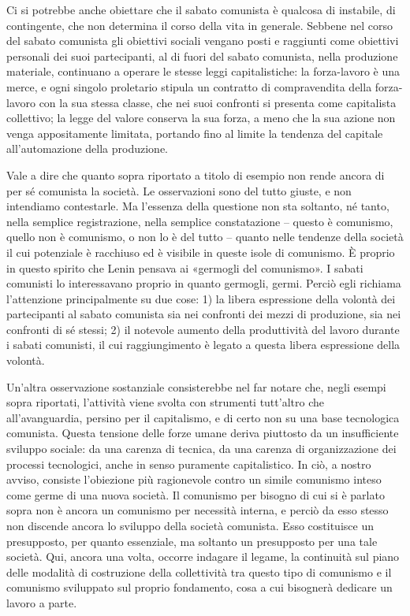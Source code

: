\documentclass[12pt,a4paper,openany]{book}
\begin{document}
Ci si potrebbe anche obiettare che il sabato comunista è qualcosa di instabile, di contingente, che non determina il corso della vita in generale. Sebbene nel corso del sabato comunista gli obiettivi sociali vengano posti e raggiunti come obiettivi personali dei suoi partecipanti, al di fuori del sabato comunista, nella produzione materiale, continuano a operare le stesse leggi capitalistiche: la forza-lavoro è una merce, e ogni singolo proletario stipula un contratto di compravendita della forza-lavoro con la sua stessa classe, che nei suoi confronti si presenta come capitalista collettivo; la legge del valore conserva la sua forza, a meno che la sua azione non venga appositamente limitata, portando fino al limite la tendenza del capitale all'automazione della produzione.

Vale a dire che quanto sopra riportato a titolo di esempio non rende ancora di per sé comunista la società. Le osservazioni sono del tutto giuste, e non intendiamo contestarle. Ma l'essenza della questione non sta soltanto, né tanto, nella semplice registrazione, nella semplice constatazione – questo è comunismo, quello non è comunismo, o non lo è del tutto – quanto nelle tendenze della società il cui potenziale è racchiuso ed è visibile in queste isole di comunismo. È proprio in questo spirito che Lenin pensava ai «germogli del comunismo». I sabati comunisti lo interessavano proprio in quanto germogli, germi. Perciò egli richiama l'attenzione principalmente su due cose: 1) la libera espressione della volontà dei partecipanti al sabato comunista sia nei confronti dei mezzi di produzione, sia nei confronti di sé stessi; 2) il notevole aumento della produttività del lavoro durante i sabati comunisti, il cui raggiungimento è legato a questa libera espressione della volontà.

Un'altra osservazione sostanziale consisterebbe nel far notare che, negli esempi sopra riportati, l'attività viene svolta con strumenti tutt'altro che all'avanguardia, persino per il capitalismo, e di certo non su una base tecnologica comunista. Questa tensione delle forze umane deriva piuttosto da un insufficiente sviluppo sociale: da una carenza di tecnica, da una carenza di organizzazione dei processi tecnologici, anche in senso puramente capitalistico. In ciò, a nostro avviso, consiste l'obiezione più ragionevole contro un simile comunismo inteso come germe di una nuova società. Il comunismo per bisogno di cui si è parlato sopra non è ancora un comunismo per necessità interna, e perciò da esso stesso non discende ancora lo sviluppo della società comunista. Esso costituisce un presupposto, per quanto essenziale, ma soltanto un presupposto per una tale società. Qui, ancora una volta, occorre indagare il legame, la continuità sul piano delle modalità di costruzione della collettività tra questo tipo di comunismo e il comunismo sviluppato sul proprio fondamento, cosa a cui bisognerà dedicare un lavoro a parte.
\end{document}
